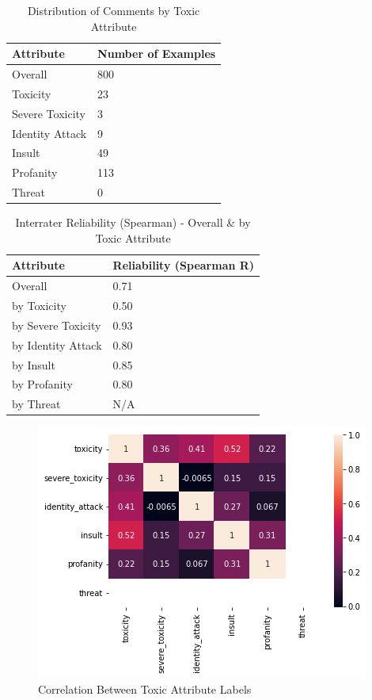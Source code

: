 \documentclass[11pt]{article}
\begin{document}
\begin{table}
\centering
\begin{tabular}{ll}
\hline
\textbf{Attribute} & \textbf{Number of Examples} \\ \hline
Overall         & 800                \\ \hline
Toxicity        & 23                 \\
Severe Toxicity & 3                  \\
Identity Attack & 9                  \\
Insult          & 49                 \\
Profanity    & 113                \\
Threat          & 0                  \\ \hline
\end{tabular}
\caption{\label{data-distribution}
Distribution of Comments by Toxic Attribute  }
\end{table}
\begin{table}
\centering
\begin{tabular}{ll}
\hline
\textbf{Attribute} & \textbf{Reliability (Spearman R)} \\ \hline
Overall            & 0.71                     \\ \hline
by Toxicity        & 0.50                     \\
by Severe Toxicity & 0.93                     \\
by Identity Attack & 0.80                     \\
by Insult          & 0.85                     \\
by Profanity       & 0.80                     \\
by Threat          & N/A                      \\ \hline
\end{tabular}
\caption{\label{interrater-summary}
Interrater Reliability (Spearman) - Overall \& by Toxic Attribute }
\end{table}
\begin{figure}[h]
    \centering
    \caption{\label{heatmap-corr}  Correlation Between Toxic Attribute Labels}
    \includegraphics[scale=0.7]{reporting/latex/heatmap-label-corr.png}
\end{figure}
\end{document}
